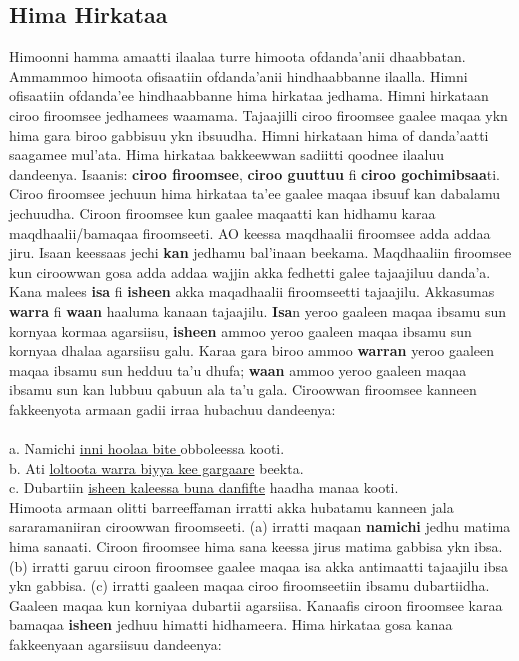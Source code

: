 \documentclass[11pt,b5paper]{book}
\begin{document}
\subsection{Hima Hirkataa}

Himoonni hamma amaatti ilaalaa turre himoota ofdanda’anii dhaabbatan. Ammammoo himoota ofisaatiin ofdanda’anii hindhaabbanne ilaalla. Himni ofisaatiin ofdanda’ee hindhaabbanne hima hirkataa jedhama. Himni hirkataan ciroo firoomsee jedhamees waamama. Tajaajilli ciroo firoomsee gaalee maqaa ykn hima gara biroo gabbisuu ykn ibsuudha. Himni hirkataan hima of danda’aatti saagamee mul’ata. Hima
hirkataa bakkeewwan sadiitti qoodnee ilaaluu dandeenya. Isaanis: \textbf{ciroo firoomsee}, \textbf{ciroo guuttuu} fi \textbf{ciroo gochimibsaa}ti. Ciroo firoomsee jechuun hima hirkataa ta’ee gaalee maqaa ibsuuf kan dabalamu jechuudha. Ciroon firoomsee kun gaalee maqaatti kan hidhamu karaa maqdhaalii/bamaqaa firoomseeti. AO keessa maqdhaalii firoomsee adda addaa jiru. Isaan keessaas jechi \textbf{kan} jedhamu bal’inaan beekama. Maqdhaaliin firoomsee kun ciroowwan gosa adda addaa wajjin akka fedhetti galee tajaajiluu danda’a. Kana malees \textbf{isa} fi \textbf{isheen} akka maqadhaalii firoomseetti tajaajilu. Akkasumas \textbf{warra} fi \textbf{waan} haaluma kanaan tajaajilu. \textbf{Isa}n yeroo gaaleen maqaa ibsamu sun kornyaa kormaa agarsiisu, \textbf{isheen} ammoo yeroo gaaleen maqaa ibsamu sun kornyaa dhalaa agarsiisu galu. Karaa gara biroo ammoo \textbf{warran} yeroo gaaleen maqaa ibsamu sun hedduu ta’u dhufa; \textbf{waan} ammoo yeroo gaaleen maqaa ibsamu sun kan lubbuu qabuun ala ta’u gala. Ciroowwan firoomsee kanneen fakkeenyota armaan gadii irraa hubachuu dandeenya: \\
\\
a. Namichi \underline{inni hoolaa bite }obboleessa kooti.\\
b. Ati \underline{loltoota warra biyya kee gargaare} beekta.\\
c. Dubartiin \underline{isheen kaleessa buna danfifte} haadha manaa kooti. \\

Himoota armaan olitti barreeffaman irratti akka hubatamu kanneen jala sararamaniiran ciroowwan firoomseeti. (a) irratti maqaan \textbf{namichi} jedhu matima hima sanaati. Ciroon firoomsee
hima sana keessa jirus matima gabbisa ykn ibsa. (b) irratti garuu ciroon firoomsee gaalee maqaa isa akka antimaatti tajaajilu ibsa ykn gabbisa. (c) irratti gaaleen maqaa ciroo firoomseetiin ibsamu dubartiidha. Gaaleen maqaa kun korniyaa dubartii agarsiisa. Kanaafis ciroon firoomsee karaa
bamaqaa \textbf{isheen} jedhuu himatti hidhameera. Hima hirkataa gosa kanaa fakkeenyaan agarsiisuu dandeenya: \\
\\
\end{document}
